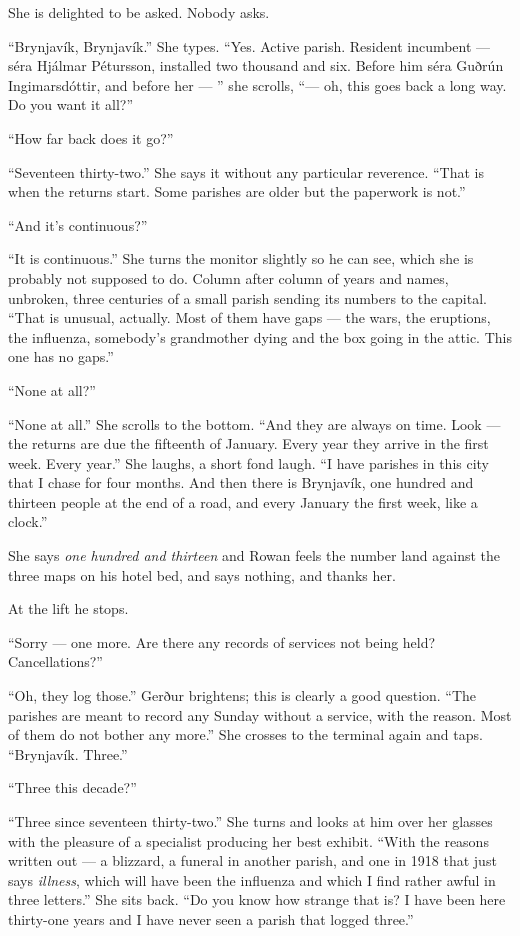 \documentclass[11pt,oneside]{book}
\begin{document}
She is delighted to be asked. Nobody asks.

``Brynjavík, Brynjavík.'' She types. ``Yes. Active parish. Resident
incumbent --- séra Hjálmar Pétursson, installed two thousand and six.
Before him séra Guðrún Ingimarsdóttir, and before her --- '' she
scrolls, ``--- oh, this goes back a long way. Do you want it all?''

``How far back does it go?''

``Seventeen thirty-two.'' She says it without any particular reverence.
``That is when the returns start. Some parishes are older but the
paperwork is not.''

``And it's continuous?''

``It is continuous.'' She turns the monitor slightly so he can see, which
she is probably not supposed to do. Column after column of years and
names, unbroken, three centuries of a small parish sending its numbers
to the capital. ``That is unusual, actually. Most of them have gaps ---
the wars, the eruptions, the influenza, somebody's grandmother dying and
the box going in the attic. This one has no gaps.''

``None at all?''

``None at all.'' She scrolls to the bottom. ``And they are always on
time. Look --- the returns are due the fifteenth of January. Every year
they arrive in the first week. Every year.'' She laughs, a short fond
laugh. ``I have parishes in this city that I chase for four months. And
then there is Brynjavík, one hundred and thirteen people at the end of a
road, and every January the first week, like a clock.''

She says \emph{one hundred and thirteen} and Rowan feels the number land
against the three maps on his hotel bed, and says nothing, and thanks
her.

At the lift he stops.

``Sorry --- one more. Are there any records of services not being held?
Cancellations?''

``Oh, they log those.'' Gerður brightens; this is clearly a good
question. ``The parishes are meant to record any Sunday without a
service, with the reason. Most of them do not bother any more.'' She
crosses to the terminal again and taps. ``Brynjavík. Three.''

``Three this decade?''

``Three since seventeen thirty-two.'' She turns and looks at him over
her glasses with the pleasure of a specialist producing her best
exhibit. ``With the reasons written out --- a blizzard, a funeral in
another parish, and one in 1918 that just says \emph{illness}, which
will have been the influenza and which I find rather awful in three
letters.'' She sits back. ``Do you know how strange that is? I have been
here thirty-one years and I have never seen a parish that logged
three.''
\end{document}
